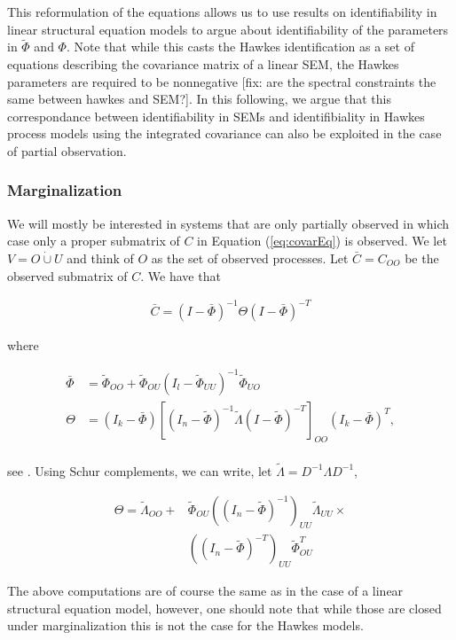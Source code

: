 \documentclass[accepted]{uai2021} %
\newcommand{\disjU}{\mathbin{\dot{\cup}}}
\begin{document}
This reformulation of the equations allows us to use results on identifiability 
in linear structural 
equation models to argue about 
identifiability of the parameters in $\tilde{\Phi}$ and $\Phi$. Note that while 
this 
casts the Hawkes identification as a set of equations describing the covariance 
matrix of a linear SEM, the Hawkes parameters are required to be nonnegative 
[fix: are the spectral constraints the same between hawkes and SEM?]. In this 
following, we argue that this correspondance between 
identifiability in SEMs and identifibiality in Hawkes process models using the 
integrated covariance can also be exploited in the case of partial observation.


\subsubsection{Marginalization}
\label{sssec:marg}

We will mostly be interested in systems that are only partially observed in 
which case only a proper submatrix of $C$ in Equation (\ref{eq:covarEq}) is 
observed. We let $V = O \disjU 
U$ and think of $O$ as the set of observed processes. Let $\bar{C} = C_{OO}$ be 
the observed submatrix of $C$. We 
have 
that 

\begin{align}
\bar{C} = (I - \bar{\Phi})^{-1}\Theta(I - \bar{\Phi})^{-T}
\end{align}

where 

\begin{align*}
\bar{\Phi} & = \tilde{\Phi}_{OO} +  \tilde{\Phi}_{OU}(I_l - 
\tilde{\Phi}_{UU})^{-1}\tilde{\Phi}_{UO} \\
\Theta & = (I_k-\bar{\Phi})[(I_n - \tilde{\Phi})^{-1}\tilde{\Lambda}(I - 
\tilde{\Phi})^{-T}]_{OO}(I_k-\bar{\Phi})^T, \\
\end{align*}

see \cite{hyttinen2012}. Using Schur complements, we can write, let 
$\tilde{\Lambda} 
= D^{-1}\Lambda D^{-1}$,

\begin{align*}
	\Theta =  \tilde{\Lambda}_{OO} + & \tilde{\Phi}_{OU}((I_n - 
	\tilde{\Phi})^{-1})_{UU}\tilde{\Lambda}_{UU} \times  \\ & ((I_n - 
	\tilde{\Phi})^{-T})_{UU}
	\tilde{\Phi}_{OU}^T
\end{align*}

The above computations are of course the same as in the case of a linear 
structural equation model, however, one should note that while those are closed 
under marginalization this is not the case for the Hawkes models.
\end{document}
